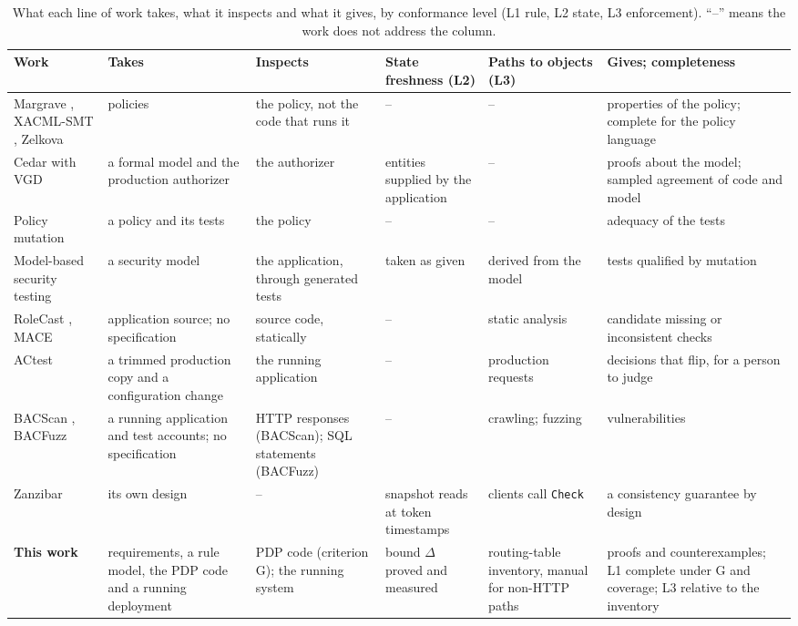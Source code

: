 \documentclass[sigconf,review,anonymous]{acmart}
\begin{document}
\begin{table}[t]
\caption{What each line of work takes, what it inspects and what it gives, by conformance level (L1 rule, L2
state, L3 enforcement). ``--'' means the work does not address the column.}
\label{tab:related}
\footnotesize
\begin{tabularx}{\textwidth}{@{}>{\raggedright\arraybackslash}p{3.3cm}@{\;\;}>{\raggedright\arraybackslash}X@{\;\;}>{\raggedright\arraybackslash}X@{\;\;}>{\raggedright\arraybackslash}X@{\;\;}>{\raggedright\arraybackslash}X@{\;\;}>{\raggedright\arraybackslash}X@{}}
\toprule
Work & Takes & Inspects & State freshness (L2) & Paths to objects (L3) & Gives; completeness \\
\midrule
Margrave \cite{fisler2005margrave}, XACML-SMT \cite{turkmen2017xacmlsmt}, Zelkova \cite{backes2018zelkova} & policies & the policy, not the code that runs it & -- & -- & properties of the policy; complete for the policy language \\
Cedar with VGD \cite{cutler2024cedar,disselkoen2024vgd} & a formal model and the production authorizer & the authorizer & entities supplied by the application & -- & proofs about the model; sampled agreement of code and model \\
Policy mutation \cite{martin2007mutation} & a policy and its tests & the policy & -- & -- & adequacy of the tests \\
Model-based security testing \cite{mouelhi2008models} & a security model & the application, through generated tests & taken as given & derived from the model & tests qualified by mutation \\
RoleCast \cite{son2011rolecast}, MACE \cite{monshizadeh2014mace} & application source; no specification & source code, statically & -- & static analysis & candidate missing or inconsistent checks \\
ACtest \cite{xiang2025actest} & a trimmed production copy and a configuration change & the running application & -- & production requests & decisions that flip, for a person to judge \\
BACScan \cite{liu2025bacscan}, BACFuzz \cite{dharmaadi2025bacfuzz} & a running application and test accounts; no specification & HTTP responses (BACScan); SQL statements (BACFuzz) & -- & crawling; fuzzing & vulnerabilities \\
Zanzibar \cite{pang2019zanzibar} & its own design & -- & snapshot reads at token timestamps & clients call \texttt{Check} & a consistency guarantee by design \\
\textbf{This work} & requirements, a rule model, the PDP code and a running deployment & PDP code (criterion G); the running system & bound $\Delta$ proved and measured & routing-table inventory, manual for non-HTTP paths & proofs and counterexamples; L1 complete under G and coverage; L3 relative to the inventory \\
\bottomrule
\end{tabularx}
\end{table}
\end{document}
